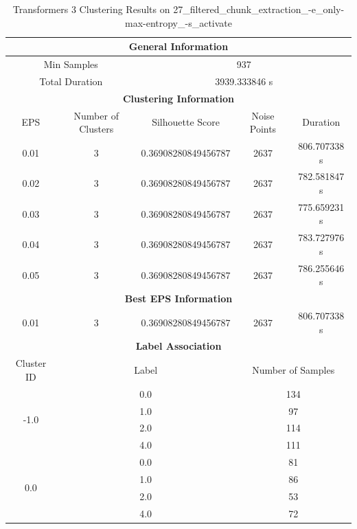 \begin{longtable}{|c|c|c|c|c|}
\caption{Transformers 3 Clustering Results on 27\_filtered\_chunk\_extraction\_-e\_only-max-entropy\_-s\_activate} \label{tab:27_filtered_chunk_extraction_-e_only-max-entropy_-s_activate_transformers_3_clustering_results}\\
\hline
\multicolumn{5}{|c|}{\textbf{General Information}} \\
\hline
\multicolumn{2}{|c|}{Min Samples} & \multicolumn{3}{c|}{937} \\
\multicolumn{2}{|c|}{Total Duration} & \multicolumn{3}{c|}{3939.333846 s} \\
\hline
\multicolumn{5}{|c|}{\textbf{Clustering Information}} \\
\hline
EPS & Number of Clusters & Silhouette Score & Noise Points & Duration \\
0.01 & 3 & 0.36908280849456787 & 2637 & 806.707338 s\\
0.02 & 3 & 0.36908280849456787 & 2637 & 782.581847 s\\
0.03 & 3 & 0.36908280849456787 & 2637 & 775.659231 s\\
0.04 & 3 & 0.36908280849456787 & 2637 & 783.727976 s\\
0.05 & 3 & 0.36908280849456787 & 2637 & 786.255646 s\\
\hline
\multicolumn{5}{|c|}{\textbf{Best EPS Information}} \\
\hline
0.01 & 3 & 0.36908280849456787 & 2637 & 806.707338 s\\
\hline
\multicolumn{5}{|c|}{\textbf{Label Association}} \\
\hline
Cluster ID & \multicolumn{2}{c|}{Label} & \multicolumn{2}{c|}{Number of Samples} \\
\hline
\multirow{4}{*}{-1.0} & \multicolumn{2}{c|}{0.0} & \multicolumn{2}{c|}{134} \\
& \multicolumn{2}{c|}{1.0} & \multicolumn{2}{c|}{97} \\
& \multicolumn{2}{c|}{2.0} & \multicolumn{2}{c|}{114} \\
& \multicolumn{2}{c|}{4.0} & \multicolumn{2}{c|}{111} \\
\hline
\multirow{4}{*}{0.0} & \multicolumn{2}{c|}{0.0} & \multicolumn{2}{c|}{81} \\
& \multicolumn{2}{c|}{1.0} & \multicolumn{2}{c|}{86} \\
& \multicolumn{2}{c|}{2.0} & \multicolumn{2}{c|}{53} \\
& \multicolumn{2}{c|}{4.0} & \multicolumn{2}{c|}{72} \\

\end{longtable}
